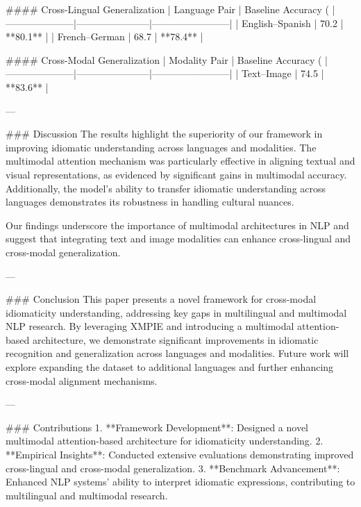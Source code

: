 #### Cross-Lingual Generalization
| Language Pair       | Baseline Accuracy (%
|---------------------|-----------------------|------------------------|
| English–Spanish     | 70.2                 | **80.1**              |
| French–German       | 68.7                 | **78.4**              |

#### Cross-Modal Generalization
| Modality Pair       | Baseline Accuracy (%
|---------------------|-----------------------|------------------------|
| Text–Image          | 74.5                 | **83.6**              |

---

### Discussion
The results highlight the superiority of our framework in improving idiomatic understanding across languages and modalities. The multimodal attention mechanism was particularly effective in aligning textual and visual representations, as evidenced by significant gains in multimodal accuracy. Additionally, the model's ability to transfer idiomatic understanding across languages demonstrates its robustness in handling cultural nuances.

Our findings underscore the importance of multimodal architectures in NLP and suggest that integrating text and image modalities can enhance cross-lingual and cross-modal generalization.

---

### Conclusion
This paper presents a novel framework for cross-modal idiomaticity understanding, addressing key gaps in multilingual and multimodal NLP research. By leveraging XMPIE and introducing a multimodal attention-based architecture, we demonstrate significant improvements in idiomatic recognition and generalization across languages and modalities. Future work will explore expanding the dataset to additional languages and further enhancing cross-modal alignment mechanisms.

---

### Contributions
1. **Framework Development**: Designed a novel multimodal attention-based architecture for idiomaticity understanding.
2. **Empirical Insights**: Conducted extensive evaluations demonstrating improved cross-lingual and cross-modal generalization.
3. **Benchmark Advancement**: Enhanced NLP systems' ability to interpret idiomatic expressions, contributing to multilingual and multimodal research.


